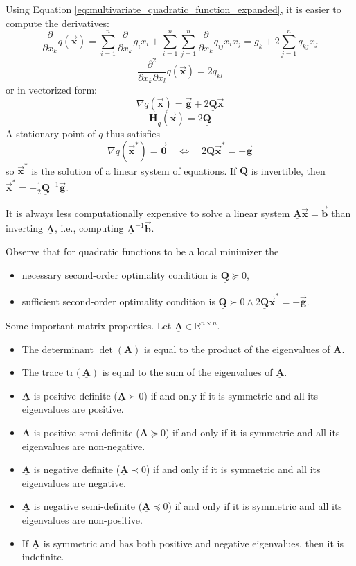 \documentclass[9pt, headings=standardclasses, parskip=half]{scrartcl}
\newcommand{\matr}[1]{\underline{\boldsymbol{#1}}}
\newcommand{\vect}[1]{\vec{\boldsymbol{#1}}}
\begin{document}
Using Equation \eqref{eq:multivariate_quadratic_function_expanded}, it is easier to compute the derivatives:
\[
\frac{\partial}{\partial x_{k}}q(\vect{x}) = \sum_{i=1}^{n}\frac{\partial}{\partial x_{k}}g_{i}x_{i} + \sum_{i=1}^{n}\sum_{j=1}^{n}\frac{\partial}{\partial x_{k}}q_{ij}x_{i}x_{j} = g_{k} + 2\sum_{j=1}^{n}q_{kj}x_{j} %
\]
\[
\frac{\partial^{2}}{\partial x_{k}\partial x_{l}}q(\vect{x}) = 2q_{kl} %
\]
or in vectorized form:
\[
\nabla q(\vect{x}) = \vect{g} + 2\matr{Q}\vect{x} %
\]
\[
\matr{H}_{q}(\vect{x}) = 2\matr{Q} %
\]
A stationary point of \(q\) thus satisfies
\[
\nabla q(\vect{x}^{*}) = \vect{0} \quad \Longleftrightarrow  \quad 2\matr{Q}\vect{x}^{*} = -\vect{g}
\]
so \(\vect{x}^{*}\) is the solution of a linear system of equations. If \(\matr{Q}\) is invertible, then 
\(\vect{x}^{*} = -\frac{1}{2}\matr{Q}^{-1}\vect{g}\).

\begin{remark}
It is always less computationally expensive to solve a linear system \(\matr{A}\vect{x} = \vect{b}\) than inverting \(\matr{A}\), i.e., computing \(\matr{A}^{-1}\vect{b}\).
\end{remark}

Observe that for quadratic functions to be a local minimizer the
\begin{itemize}
\item necessary second-order optimality condition is \(\matr{Q} \succeq 0\),
\item sufficient second-order optimality condition is \(\matr{Q} \succ 0 \wedge 2\matr{Q}\vect{x}^{*} = -\vect{g}\).
\end{itemize}

\begin{caution}
Some important matrix properties. Let \(\matr{A} \in \mathbb{R}^{n \times n}\).
\begin{itemize}
\item The determinant \(\det(\matr{A})\) is equal to the product of the eigenvalues of \(\matr{A}\).
\item The trace \(\mathrm{tr}(\matr{A})\) is equal to the sum of the eigenvalues of \(\matr{A}\).
\item \(\matr{A}\) is positive definite (\(\matr{A} \succ 0\)) if and only if it is symmetric and all its eigenvalues are positive.
\item \(\matr{A}\) is positive semi-definite (\(\matr{A} \succeq 0\)) if and only if it is symmetric and all its eigenvalues are non-negative.
\item \(\matr{A}\) is negative definite (\(\matr{A} \prec 0\)) if and only if it is symmetric and all its eigenvalues are negative.
\item \(\matr{A}\) is negative semi-definite (\(\matr{A} \preceq 0\)) if and only if it is symmetric and all its eigenvalues are non-positive.
\item If \(\matr{A}\) is symmetric and has both positive and negative eigenvalues, then it is indefinite.
\end{itemize}
\end{caution}
\end{document}
